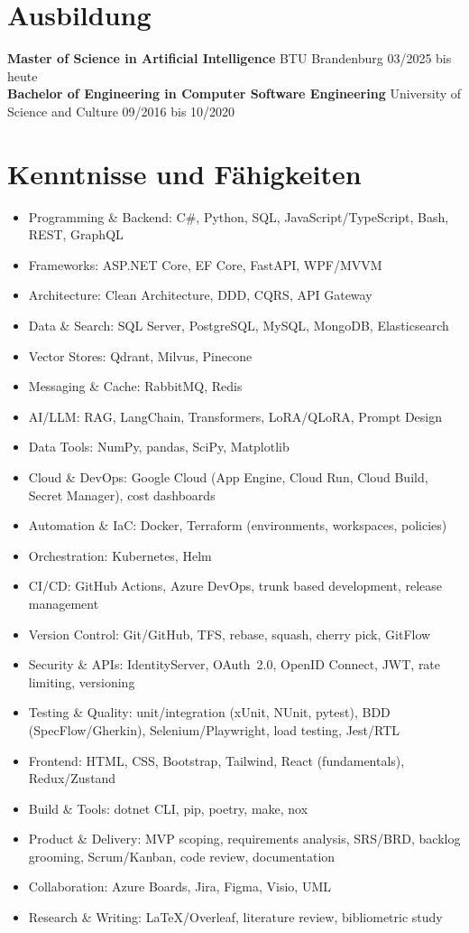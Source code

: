 \documentclass[10pt]{article}
\begin{document}
\section*{Ausbildung}
\textbf{Master of Science in Artificial Intelligence} \quad BTU Brandenburg \hfill 03/2025 bis heute\\
\textbf{Bachelor of Engineering in Computer Software Engineering} \quad University of Science and Culture \hfill 09/2016 bis 10/2020

\section*{Kenntnisse und Fähigkeiten}
\begin{multicols}{3}
\begin{itemize}
  \item Programming \& Backend: C\#, Python, SQL, JavaScript/TypeScript, Bash, REST, GraphQL
  \item Frameworks: ASP.NET Core, EF Core, FastAPI, WPF/MVVM
  \item Architecture: Clean Architecture, DDD, CQRS, API Gateway
  \item Data \& Search: SQL Server, PostgreSQL, MySQL, MongoDB, Elasticsearch
  \item Vector Stores: Qdrant, Milvus, Pinecone
  \item Messaging \& Cache: RabbitMQ, Redis
  \item AI/LLM: RAG, LangChain, Transformers, LoRA/QLoRA, Prompt Design
  \item Data Tools: NumPy, pandas, SciPy, Matplotlib
  \item Cloud \& DevOps: Google Cloud (App Engine, Cloud Run, Cloud Build, Secret Manager), cost dashboards
  \item Automation \& IaC: Docker, Terraform (environments, workspaces, policies)
  \item Orchestration: Kubernetes, Helm
  \item CI/CD: GitHub Actions, Azure DevOps, trunk based development, release management
  \item Version Control: Git/GitHub, TFS, rebase, squash, cherry pick, GitFlow
  
  \item Security \& APIs: IdentityServer, OAuth~2.0, OpenID Connect, JWT, rate limiting, versioning
  \item Testing \& Quality: unit/integration (xUnit, NUnit, pytest), BDD (SpecFlow/Gherkin), Selenium/Playwright, load testing, Jest/RTL
  \item Frontend: HTML, CSS, Bootstrap, Tailwind, React (fundamentals), Redux/Zustand
  \item Build \& Tools: dotnet CLI, pip, poetry, make, nox
  \item Product \& Delivery: MVP scoping, requirements analysis, SRS/BRD, backlog grooming, Scrum/Kanban, code review, documentation
  \item Collaboration: Azure Boards, Jira, Figma, Visio, UML
  \item Research \& Writing: LaTeX/Overleaf, literature review, bibliometric study
\end{itemize}
\end{multicols}
\end{document}
